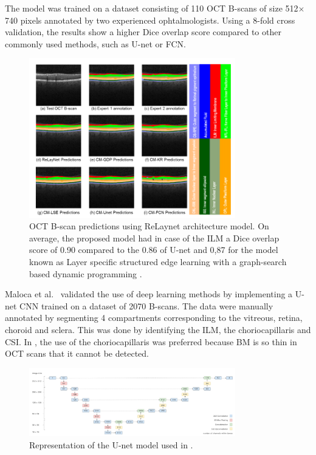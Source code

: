 \documentclass[12pt,a4paper]{scrartcl}
\begin{document}
The model was trained on a dataset consisting of 110 OCT B-scans of size 512$\times$740 pixels annotated by two experienced  ophtalmologists. Using a 8-fold cross validation, the results show a higher Dice overlap score compared to other commonly used methods, such as U-net or FCN.

\begin{figure}[H]
    \centering
    \includegraphics[width=0.8\textwidth]{./images/relaynet-predictions.png}
    \caption{OCT B-scan predictions using ReLaynet architecture model. On average, the proposed model had in case of the ILM a Dice overlap score of 0.90 compared to the 0.86 of U-net and 0,87 for the model known as Layer specific structured edge learning with a graph-search based dynamic programming  \cite{Roy2017}.}
\end{figure}

Maloca et al.~\cite{Maloca2019} validated the use of deep learning methods by implementing a U-net CNN trained on a dataset of 2070 B-scans. The data were manually annotated by segmenting 4 compartments corresponding to the vitreous, retina, choroid and sclera. This was done by identifying the ILM, the choriocapillaris and CSI. In \cite{Maloca2019}, the use of the choriocapillaris was preferred because BM is so thin in OCT scans that it cannot be detected.

\begin{figure}[H]
    \centering
    \includegraphics[width=0.8\textwidth]{./images/maloca-unet.png}
    \caption{Representation of the U-net model used in \cite{Maloca2019}.}
\end{figure}
\end{document}
